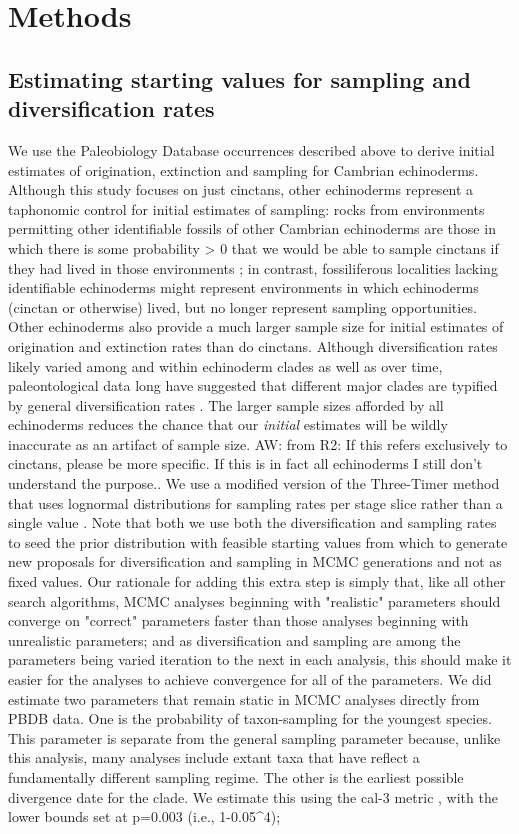 \documentclass{article}
\newcommand{\amw}[1]{{\textcolor{OliveGreen}{AW: #1}}} %
\begin{document}
\section{Methods}
\subsection{Estimating starting values for sampling and diversification rates}
We use the Paleobiology Database occurrences described above to derive initial estimates of origination, extinction and sampling for Cambrian echinoderms.  Although this study focuses on just cinctans, other echinoderms represent a taphonomic control for initial estimates of sampling: rocks from environments permitting other identifiable fossils of other Cambrian echinoderms are those in which there is some probability > 0 that we would be able to sample cinctans if they had lived in those environments \cite{BottjerJablonski1988}; in contrast, fossiliferous localities lacking identifiable echinoderms might represent environments in which echinoderms (cinctan or otherwise) lived, but no longer represent sampling opportunities. Other echinoderms also provide a much larger sample size for initial estimates of origination and extinction rates than do cinctans. Although diversification rates likely varied among and within echinoderm clades as well as over time, paleontological data long have suggested that different major clades are typified by general diversification rates \cite{Sepkoski1981}. The larger sample sizes afforded by all echinoderms reduces the chance that our \textit{initial} estimates will be wildly inaccurate as an artifact of sample size. \amw{from R2: If this refers exclusively to cinctans, please be more specific. If this is in fact all echinoderms I still don't understand the purpose.}. We use a modified version of the Three-Timer method \citep{Alroy2015} that uses lognormal distributions for sampling rates per stage slice rather than a single value \citep{WagnerMarcot2013}. Note that both we use both the diversification and sampling rates to seed the prior distribution with feasible starting values from which to generate new proposals for diversification and sampling in MCMC generations and not as fixed values. Our rationale for adding this extra step is simply that, like all other search algorithms, MCMC analyses beginning with "realistic" parameters should converge on "correct" parameters faster than those analyses beginning with unrealistic parameters; and as diversification and sampling are among the parameters being varied iteration to the next  in each analysis, this should make it easier for the analyses to achieve convergence for all of the parameters. We did estimate two parameters that remain static in MCMC analyses directly from PBDB data. One is the probability of taxon-sampling for the youngest species. This parameter is separate from the general sampling parameter because, unlike this analysis, many analyses include extant taxa that have reflect a fundamentally different sampling regime. The other is the earliest possible divergence date for the clade.  We estimate this using the cal-3 metric \citep{Bapst2013}, with the lower bounds set at p=0.003 (i.e., 1-0.05^4); 
\end{document}

